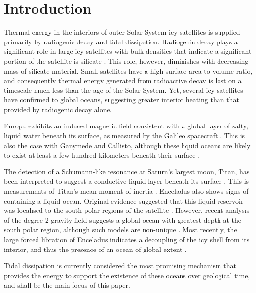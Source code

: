 \newpage
\section{Introduction}


Thermal energy in the interiors of outer Solar System icy satellites is supplied primarily by radiogenic decay and tidal dissipation. Radiogenic decay plays a significant role in large icy satellites with bulk densities that indicate a significant portion of the satellite is silicate \citep{hussmann2006subsurface}. This role, however, diminishes with decreasing mass of silicate material. Small satellites have a high surface area to volume ratio, and consequently thermal energy generated from radioactive decay is lost on a timescale much less than the age of the Solar System. Yet, several icy satellites have confirmed to global oceans, suggesting greater interior heating than that provided by radiogenic decay alone.

Europa exhibits an induced magnetic field consistent with a global layer of salty, liquid water beneath its surface, as measured by the Galileo spacecraft \citep{zimmer2000subsurface, kivelson2000galileo, hand2007empirical}. This is also the case with Ganymede and Callisto, although these liquid oceans are likely to exist at least a few hundred kilometers beneath their surface \citep{zimmer2000subsurface, kivelson2000galileo}. 

The detection of a Schumann-like resonance at Saturn's largest moon, Titan, has been interpreted to suggest a conductive liquid layer beneath its surface \citep{beghin2010titan}. This is measurements of Titan's mean moment of inertia \citep{bills2011rotational}. Enceladus also shows signs of containing a liquid ocean. Original evidence suggested that this liquid reservoir was localised to the south polar regions of the satellite \citep[e.g.,][]{collins2007enceladus}. However, recent analysis of the degree 2 gravity field suggests a global ocean with greatest depth at the south polar region, although such models are non-unique \citep{iess2014gravity,mckinnon2015effect}. Most recently, the large forced libration of Enceladus indicates a decoupling of the icy shell from its interior, and thus the presence of an ocean of global extent \citep{thomas2015enceladus}.  

Tidal dissipation is currently considered the most promising mechanism that provides the energy to support the existence of these oceans over geological time, and shall be the main focus of this paper.

